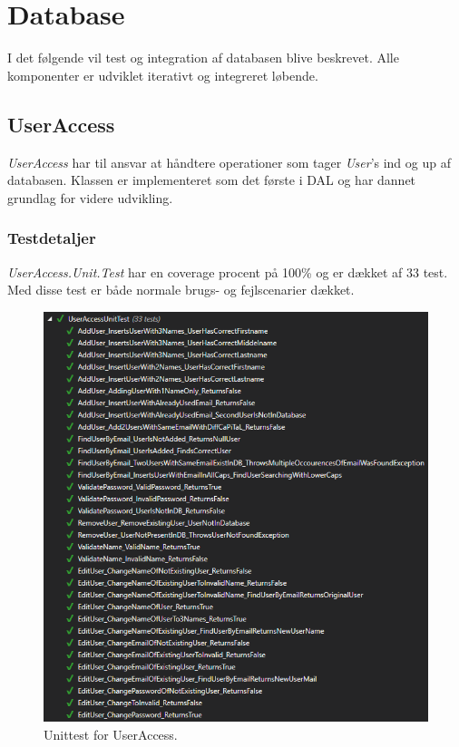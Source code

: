 \section{Database}\label{sec:testdatabase}
I det følgende vil test og integration af databasen blive beskrevet. Alle komponenter er udviklet iterativt og integreret løbende.

\subsection{UserAccess}
\textit{UserAccess} har til ansvar at håndtere operationer som tager \textit{User}'s ind og up af databasen. Klassen er implementeret som det første i DAL og har dannet grundlag for videre udvikling.

\subsubsection{Testdetaljer}
\textit{UserAccess.Unit.Test} har en coverage procent på 100\% og er dækket af 33 test. Med disse test er både normale brugs- og fejlscenarier dækket.

\begin{figure}[H]
\centering
\includegraphics[width=0.9\linewidth]{figs/test/useraccessunittest}
\caption{Unittest for UserAccess.}
\label{fig:useraccessunittest}
\end{figure}

